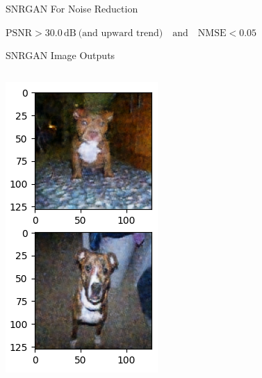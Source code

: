 \begin{frame}{SNRGAN For Noise Reduction}
    \vspace{0.1em} 
    \begin{center}
        $\mathrm{PSNR} > 30.0\,\mathrm{dB} \ \text{(and upward trend)} \quad \text{and} \quad \mathrm{NMSE} < 0.05$
    \end{center}
\end{frame}

\begin{frame}{SNRGAN Image Outputs}
    \vspace{0.3em} 
    \begin{columns}
        \begin{column}{0.33\textwidth}
            \includegraphics[width=\linewidth,height=0.6\textheight,keepaspectratio]{images/img3.png}

\end{column}
\end{columns}
\end{frame}
